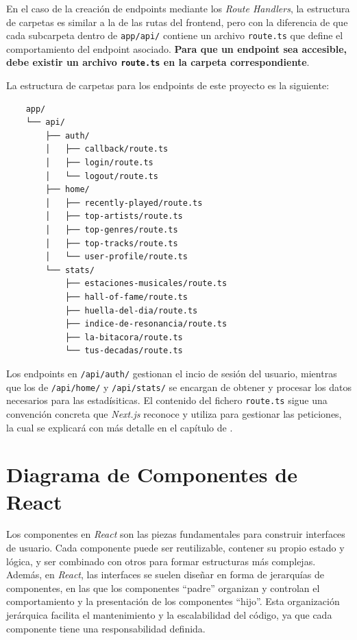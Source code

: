 En el caso de la creación de endpoints mediante los \textit{Route Handlers}, la estructura de carpetas es similar a la de las rutas del frontend, pero con la diferencia de que cada subcarpeta dentro de \texttt{app/api/} contiene un archivo \texttt{route.ts} que define el comportamiento del endpoint asociado. \textbf{Para que un endpoint sea accesible, debe existir un archivo \texttt{route.ts} en la carpeta correspondiente}.

La estructura de carpetas para los endpoints de este proyecto es la siguiente:

\newpage

\begin{verbatim}
    app/
    └── api/
        ├── auth/
        │   ├── callback/route.ts
        │   ├── login/route.ts
        │   └── logout/route.ts
        ├── home/
        │   ├── recently-played/route.ts
        │   ├── top-artists/route.ts
        │   ├── top-genres/route.ts
        │   ├── top-tracks/route.ts
        │   └── user-profile/route.ts
        └── stats/
            ├── estaciones-musicales/route.ts
            ├── hall-of-fame/route.ts
            ├── huella-del-dia/route.ts
            ├── indice-de-resonancia/route.ts
            ├── la-bitacora/route.ts
            └── tus-decadas/route.ts
\end{verbatim}

Los endpoints en \texttt{/api/auth/} gestionan el incio de sesión del usuario, mientras que los de \texttt{/api/home/} y \texttt{/api/stats/} se encargan de obtener y procesar los datos necesarios para las estadísiticas. El contenido del fichero \texttt{route.ts} sigue una convención concreta que \textit{Next.js} reconoce y utiliza para gestionar las peticiones, la cual se explicará con más detalle en el capítulo de .

\section{Diagrama de Componentes de React}

Los componentes en \textit{React} son las piezas fundamentales para construir interfaces de usuario. Cada componente puede ser reutilizable, contener su propio estado y lógica, y ser combinado con otros para formar estructuras más complejas. Además, en \textit{React}, las interfaces se suelen diseñar en forma de jerarquías de componentes, en las que los componentes ``padre'' organizan y controlan el comportamiento y la presentación de los componentes ``hijo''. Esta organización jerárquica facilita el mantenimiento y la escalabilidad del código, ya que cada componente tiene una responsabilidad definida.

